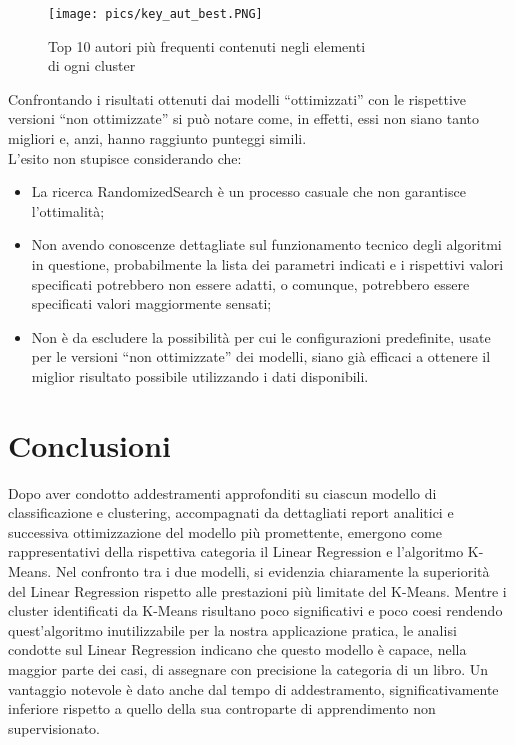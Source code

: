 \documentclass[12pt,oneside]{article}
\begin{document}
        \begin{figure}[H]
        \texttt{[image: pics/key\_aut\_best.PNG]}
        \captionsetup{width=0.80\textwidth, justification=centering}
        \caption{Top 10 autori più frequenti contenuti negli elementi\\ di ogni cluster}
        \end{figure}

\newpage
        \begin{justify}
        Confrontando i risultati ottenuti dai modelli “ottimizzati” con le rispettive versioni “non ottimizzate” si può notare come, in effetti, essi non siano tanto migliori e, anzi, hanno raggiunto punteggi simili.\\
        L'esito non stupisce considerando che: 
        \begin{itemize}
            \item La ricerca RandomizedSearch è un processo casuale che non garantisce l’ottimalità;
            \item Non avendo conoscenze dettagliate sul funzionamento tecnico degli algoritmi in questione, probabilmente la lista dei parametri indicati e i rispettivi valori specificati potrebbero non essere adatti, o comunque, potrebbero essere specificati valori maggiormente sensati;
            \item Non è da escludere la possibilità per cui le configurazioni predefinite, usate per le versioni “non ottimizzate” dei modelli, siano già efficaci a ottenere il miglior risultato possibile utilizzando i dati disponibili.
        \end{itemize}
    \end{justify}

    \section{Conclusioni}
    \begin{justify}
        Dopo aver condotto addestramenti approfonditi su ciascun modello di classificazione e clustering, accompagnati da dettagliati report analitici e successiva ottimizzazione del modello più promettente, emergono come rappresentativi della rispettiva categoria il Linear Regression e l'algoritmo K-Means.
        Nel confronto tra i due modelli, si evidenzia chiaramente la superiorità del Linear Regression rispetto alle prestazioni più limitate del K-Means. 
        Mentre i cluster identificati da K-Means risultano poco significativi e poco coesi rendendo quest'algoritmo inutilizzabile per la nostra applicazione pratica, le analisi condotte sul Linear Regression indicano che questo modello è capace, nella maggior parte dei casi, di assegnare con precisione la categoria di un libro. Un vantaggio notevole è dato anche dal tempo di addestramento, significativamente inferiore rispetto a quello della sua controparte di apprendimento non supervisionato.
        \end{justify}
\end{document}
